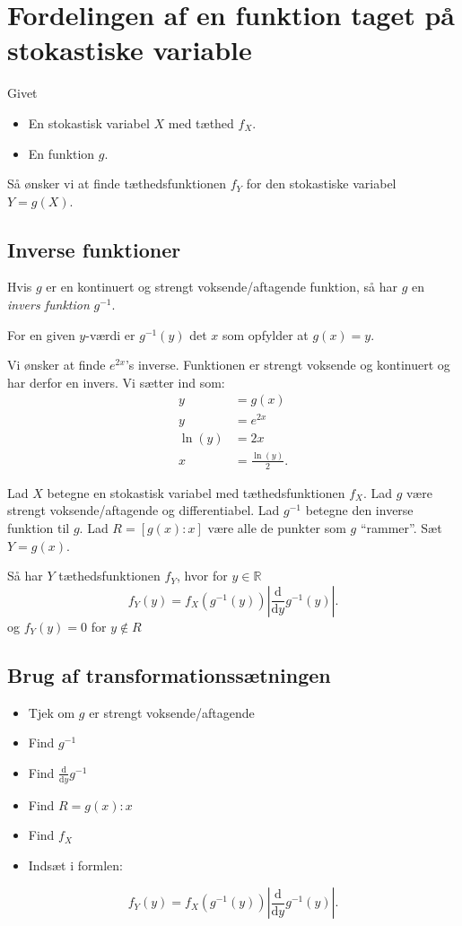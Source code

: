 \section{Fordelingen af en funktion taget på stokastiske variable}
Givet
\begin{itemize}
  \item En stokastisk variabel $X$ med tæthed $f_X$.
  \item En funktion $g$.
\end{itemize}
Så ønsker vi at finde tæthedsfunktionen $f_Y$ for den stokastiske variabel $Y = g(X)$.

\subsection{Inverse funktioner}
Hvis $g$ er en kontinuert og strengt voksende/aftagende funktion, så har $g$ en \textit{invers funktion} $g^{-1}$. 

For en given $y$-værdi er $g^{-1}(y)$ det $x$ som opfylder at $g(x) = y$.

\begin{eks} 
  Vi ønsker at finde $e^{2x}$'s inverse.
  \bigbreak
  Funktionen er strengt voksende og kontinuert og har derfor en invers. Vi sætter ind som:
  \begin{align*}
    y &= g(x) \\
    y &= e^{2x} \\
    \ln(y) &= 2x \\
    x &= \frac{\ln(y)}{2}
  .\end{align*}
\end{eks}

\begin{sæt} [Transformationssætningen]
  Lad $X$ betegne en stokastisk variabel med tæthedsfunktionen $f_X$. Lad $g$ være strengt voksende/aftagende og differentiabel. Lad $g^{-1}$ betegne den inverse funktion til $g$. Lad $R = [g(x): x]$ være alle de punkter som $g$ ``rammer''. Sæt $Y = g(x)$. 

  Så har $Y$ tæthedsfunktionen $f_Y$, hvor for $y \in \mathbb{R}$
  \[ 
    f_Y(y) = f_X \left( g^{-1}(y) \right) \left| \frac{\mathrm{d}}{\mathrm{d}y} g^{-1}(y) \right|
  .\]
  og $f_Y (y) = 0$ for $y \not\in R$
\end{sæt}

\subsection{Brug af transformationssætningen}
\begin{itemize}
  \item Tjek om $g$ er strengt voksende/aftagende
  \item Find $g^{-1}$
  \item Find $\frac{\mathrm{d}}{\mathrm{d}y} g^{-1}$
  \item Find $R = {g(x): x}$
  \item Find $f_X$
  \item Indsæt i formlen:
\end{itemize}
\[ 
f_Y(y) = f_X \left( g^{-1}(y) \right) \left| \frac{\mathrm{d}}{\mathrm{d}y} g^{-1}(y) \right|
.\]

